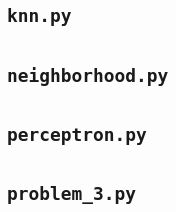 \documentclass[a4paper, 11pt, titlepage]{article}
\begin{document}
  \subsection{\texttt{knn.py}}
  
  \subsection{\texttt{neighborhood.py}}
  
  \subsection{\texttt{perceptron.py}}
  
  \subsection{\texttt{problem\_3.py}}
  
\end{document}
